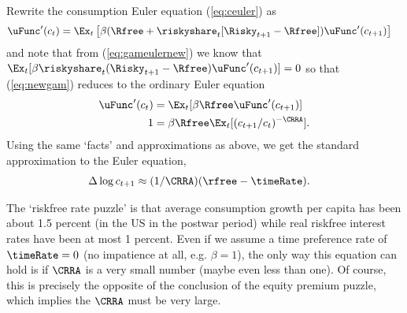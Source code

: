 \documentclass{\econtex}
\begin{document}

Rewrite the consumption Euler equation (\ref{eq:ceuler}) as 
\begin{equation}\begin{gathered}\begin{aligned}
      \uFunc^{\prime}(c_{t}) & =  \Ex_{t}\left[\beta (\Rfree  + \riskyshare_{t} [\Risky_{t+1} - \Rfree])\uFunc^{\prime}({c}_{t+1})\right] \label{eq:newgam}
    \end{aligned}\end{gathered}\end{equation}
and note that from (\ref{eq:gameulernew}) we know that $\Ex_{t}[\beta 
\riskyshare_{t}(\Risky_{t+1}-\Rfree)\uFunc^{\prime}({c}_{t+1})] = 0$ so that 
(\ref{eq:newgam}) reduces to the ordinary Euler equation
\begin{equation}\begin{gathered}\begin{aligned}
      \uFunc^{\prime}(c_{t}) & =  \Ex_{t}[\beta \Rfree \uFunc^{\prime}({c}_{t+1})]
      \\  1 & =  \beta \Rfree \Ex_{t}[ ({c}_{t+1}/c_{t})^{-\CRRA}].
    \end{aligned}\end{gathered}\end{equation}
Using the same `facts' and approximations as above, we get the 
standard approximation to the Euler equation,
\begin{equation}\begin{gathered}\begin{aligned}
      \Delta \log c_{t+1} & \approx  (1/\CRRA) (\rfree - \timeRate).
    \end{aligned}\end{gathered}\end{equation}

The `riskfree rate puzzle' is that average consumption growth per 
capita has been about 1.5 percent (in the US in the postwar period) 
while real riskfree interest rates have been at most 1 percent.  Even
if we assume a time preference rate of $\timeRate=0$ (no impatience 
at all, e.g. $\beta=1$), the only way this equation can hold is if $\CRRA$ is a
very small number (maybe even less than one).  Of course, this
is precisely the opposite of the conclusion of the equity premium
puzzle, which implies the $\CRRA$ must be very large.
\end{document}
